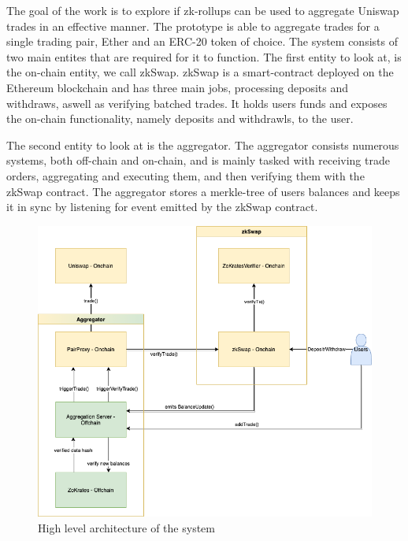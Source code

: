 \documentclass[../../thesis.tex]{subfiles}
\begin{document}
The goal of the work is to explore if zk-rollups can be used to aggregate Uniswap trades in an effective manner. The prototype is able to aggregate trades for a single trading pair, Ether and an ERC-20 token of choice. The system consists of two main entites that are required for it to function. The first entity to look at, is the on-chain entity, we call zkSwap. zkSwap is a smart-contract deployed on the Ethereum blockchain and has three main jobs, processing deposits and withdraws, aswell as verifying batched trades. It holds users funds and exposes the on-chain functionality, namely deposits and withdrawls, to the user. 

The second entity to look at is the aggregator. The aggregator consists numerous systems, both off-chain and on-chain, and is mainly tasked with receiving trade orders, aggregating and executing them, and then verifying them with the zkSwap contract. The aggregator stores a merkle-tree of users balances and keeps it in sync by listening for event emitted by the zkSwap contract.

\begin{figure}[h]
    \centerline{\includegraphics[totalheight=8cm]{diagrams/architecture.png}}
    \caption{High level architecture of the system}
    \label{fig:architecture}
\end{figure}
\end{document}
